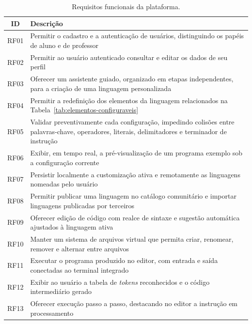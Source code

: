 \begin{table}[htbp]
    \centering
    \caption{Requisitos funcionais da plataforma.}
    \label{tab:requisitos-funcionais}
    \footnotesize
    \setlength{\tabcolsep}{4pt}
    \renewcommand{\arraystretch}{1.15}
    \begin{tabular}{|c|>{\raggedright\arraybackslash}p{12.3cm}|}
        \hline
        \textbf{ID} & \textbf{Descrição} \\
        \hline
        RF01 & Permitir o cadastro e a autenticação de usuários, distinguindo os papéis de aluno e de professor \\
        \hline
        RF02 & Permitir ao usuário autenticado consultar e editar os dados de seu perfil \\
        \hline
        RF03 & Oferecer um assistente guiado, organizado em etapas independentes, para a criação de uma linguagem personalizada \\
        \hline
        RF04 & Permitir a redefinição dos elementos da linguagem relacionados na Tabela~\ref{tab:elementos-configuraveis} \\
        \hline
        RF05 & Validar preventivamente cada configuração, impedindo colisões entre palavras-chave, operadores, literais, delimitadores e terminador de instrução \\
        \hline
        RF06 & Exibir, em tempo real, a pré-visualização de um programa exemplo sob a configuração corrente \\
        \hline
        RF07 & Persistir localmente a customização ativa e remotamente as linguagens nomeadas pelo usuário \\
        \hline
        RF08 & Permitir publicar uma linguagem no catálogo comunitário e importar linguagens publicadas por terceiros \\
        \hline
        RF09 & Oferecer edição de código com realce de sintaxe e sugestão automática ajustados à linguagem ativa \\
        \hline
        RF10 & Manter um sistema de arquivos virtual que permita criar, renomear, remover e alternar entre arquivos \\
        \hline
        RF11 & Executar o programa produzido no editor, com entrada e saída conectadas ao terminal integrado \\
        \hline
        RF12 & Exibir ao usuário a tabela de \textit{tokens} reconhecidos e o código intermediário gerado \\
        \hline
        RF13 & Oferecer execução passo a passo, destacando no editor a instrução em processamento \\

\end{tabular}
\end{table}
